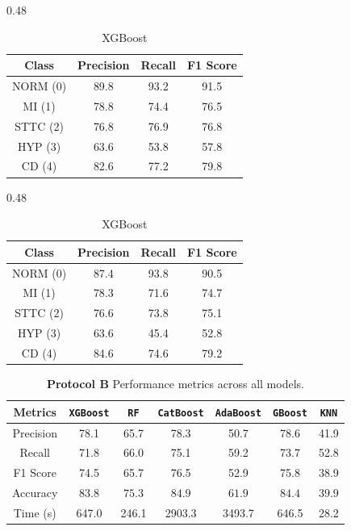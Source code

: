 \begin{table}[H]
    \begin{subtable}[t]{0.48\textwidth}
        \centering
        \caption{CatBoost}
        \label{tab:cv_cat_part2_ablation}
        \begin{tabular}{cccc}
            \toprule
            Class & Precision & Recall & F1 Score \\
            \midrule
            NORM (0) & 89.8 & 93.2 & 91.5 \\
            MI   (1) & 78.8 & 74.4 & 76.5 \\
            STTC (2) & 76.8 & 76.9 & 76.8 \\
            HYP  (3) & 63.6 & 53.8 & 57.8 \\
            CD   (4) & 82.6 & 77.2 & 79.8 \\
            \bottomrule
        \end{tabular}
    \end{subtable}
    \hfill
    \begin{subtable}[t]{0.48\textwidth}
        \centering
        \caption{XGBoost}
        \label{tab:cv_xgb_part2_ablation}
        \begin{tabular}{cccc}
            \toprule
            Class & Precision & Recall & F1 Score \\
            \midrule
            NORM (0) & 87.4 & 93.8 & 90.5 \\
            MI   (1) & 78.3 & 71.6 & 74.7 \\
            STTC (2) & 76.6 & 73.8 & 75.1 \\
            HYP  (3) & 63.6 & 45.4 & 52.8 \\
            CD   (4) & 84.6 & 74.6 & 79.2 \\
            \bottomrule
        \end{tabular}
    \end{subtable}
\end{table}

\begin{table}[H]
    \centering
    \caption{\textbf{Protocol B} Performance metrics across all models.}
    \label{tab:single_model_wise_part2_ablation}
    \begin{tabular}{ccccccc}
        \toprule
        Metrics & \texttt{XGBoost} & \texttt{RF} & \texttt{CatBoost} & \texttt{AdaBoost} & \texttt{GBoost} & \texttt{KNN} \\
        \midrule
        Precision & 78.1 & 65.7 & 78.3 & 50.7 & 78.6 & 41.9 \\
        Recall & 71.8 & 66.0 & 75.1 & 59.2 & 73.7 & 52.8 \\
        F1 Score & 74.5 & 65.7 & 76.5 & 52.9 & 75.8 & 38.9 \\
        Accuracy & $83.8$ & $75.3$ & $84.9$ & $61.9$ & $84.4$ & $39.9$ \\
        \midrule
        \midrule
        Time (s) & 647.0 & 246.1 & 2903.3 & 3493.7 & 646.5 & 28.2 \\
        \bottomrule
    \end{tabular}
\end{table}

